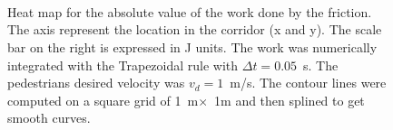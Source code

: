 

\begin{figure}[!htbp]
    \\ 
    \\
    \
\caption[width=0.47\columnwidth] {Heat map for the absolute value of the work done by the friction. The axis represent the location in the corridor (x and y). The scale bar on the right is expressed in J units. The work was numerically integrated with the Trapezoidal rule with $\Delta t =0.05$~s. The pedestrians desired velocity was $v_d = 1$~m/s. The contour lines were computed on a square grid of 1~m$\times$~1m and then splined to get smooth curves.} 
 \label{abswg}
\end{figure}

